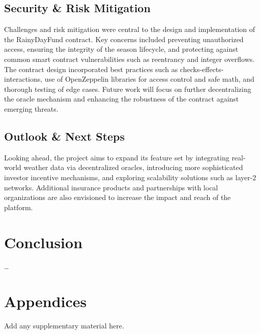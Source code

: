 \documentclass[11pt,a4paper]{article}
\begin{document}
    \subsection{Security \& Risk Mitigation}\label{subsec:security-risk}
    Challenges and risk mitigation were central to the design and implementation of the RainyDayFund contract. Key concerns included preventing unauthorized access, ensuring the integrity of the season lifecycle, and protecting against common smart contract vulnerabilities such as reentrancy and integer overflows. The contract design incorporated best practices such as checks-effects-interactions, use of OpenZeppelin libraries for access control and safe math, and thorough testing of edge cases. Future work will focus on further decentralizing the oracle mechanism and enhancing the robustness of the contract against emerging threats.

    \subsection{Outlook \& Next Steps}\label{subsec:outlook}
    Looking ahead, the project aims to expand its feature set by integrating real-world weather data via decentralized oracles, introducing more sophisticated investor incentive mechanisms, and exploring scalability solutions such as layer-2 networks. Additional insurance products and partnerships with local organizations are also envisioned to increase the impact and reach of the platform.

    \section{Conclusion}\label{sec:conclusion}
    \ldots

    \printbibliography

    \appendix
    \section*{Appendices}\label{sec:appendix}
    Add any supplementary material here.
\end{document}

